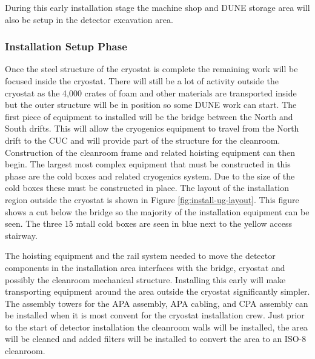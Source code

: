 During this early installation stage the machine shop and DUNE storage area will also be setup in the detector excavation area.

\subsubsection{Installation Setup Phase}

Once the steel structure of the cryostat is complete the remaining work will be focused inside the cryostat. 
There will still be a lot of activity outside the cryostat as the 4,000 crates of foam and other materials are transported inside but the outer structure will be in position so some DUNE work can start. 
The first piece of equipment to installed will be the bridge between the North and South drifts. 
This will allow the cryogenics equipment to travel from the North drift to the CUC and will provide part of the structure for the cleanroom. 
Construction of the cleanroom frame and related hoisting equipment can then begin. 
The largest most complex equipment that must be constructed in this phase are the cold boxes and related cryogenics system. 
Due to the size of the cold boxes these must be constructed in place. 
The layout of the installation region outside the cryostat is shown in Figure \ref{fig:install-ug-layout}. 
This figure shows a cut below the bridge so the majority of the installation equipment can be seen. 
The three 15 \si{m}tall cold boxes are seen in blue next to the yellow access stairway. 

The hoisting equipment and the rail system needed to move the detector components in the installation area interfaces with the bridge, cryostat and possibly the cleanroom mechanical structure. 
Installing this early will make transporting equipment around the area outside the cryostat significantly simpler. 
The assembly towers for the APA assembly, APA cabling, and CPA assembly can be installed when it is most convent for the cryostat installation crew. 
Just prior to the start of detector installation the cleanroom walls will be installed, the area will be cleaned and added filters will be installed to convert the area to an ISO-8 cleanroom.

